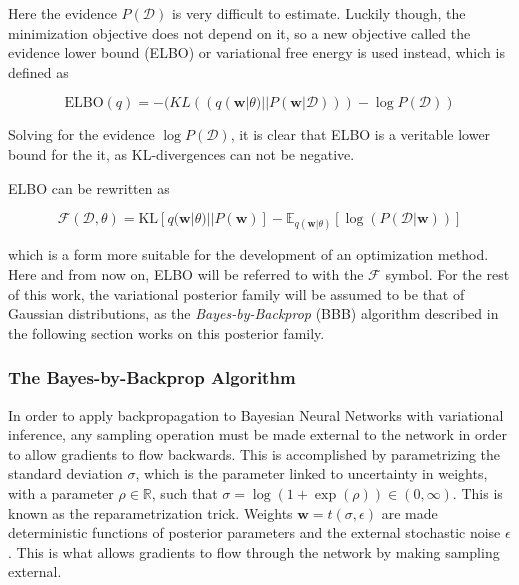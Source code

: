 	 Here the evidence $P(\mathcal{D})$ is very difficult to estimate. Luckily though, the minimization objective does not depend on it, so a new objective called the evidence lower bound (ELBO) or variational free energy is used instead, which is defined as 
	 
	 \begin{equation}
	 	\text{ELBO}(q) = -(KL((q(\pmb{w}|\theta) ||P(\pmb{w}|\mathcal{D}))) - \log P(\mathcal{D}))
	 \end{equation}
	 
	 Solving for the evidence $\log P(\mathcal{D})$, it is clear that ELBO is a veritable lower bound for the it, as KL-divergences can not be negative.  

	ELBO can be rewritten as
	
	\begin{equation}
	\label{eq:elbo}
		\mathcal{F}(\mathcal{D}, \theta) = 
		\text{KL}[q(\pmb{w}|\theta) || P(\pmb{w})] - \mathbb{E}_{q(\pmb{w}|\theta)}[\log(P(\mathcal{D}|\pmb{w}))]
	\end{equation}
	
	which is a form more suitable for the development of an optimization method. Here and from now on, ELBO will be referred to with the $\mathcal{F}$ symbol. For the rest of this work, the variational posterior family will be assumed to be that of Gaussian distributions, as the \textit{Bayes-by-Backprop} (BBB) algorithm described in the following section works on this posterior family. 
	
	\subsubsection*{The Bayes-by-Backprop Algorithm}

	In order to apply backpropagation to Bayesian Neural Networks with variational inference, any sampling operation must be made external to the network in order to allow gradients to flow backwards. This is accomplished by parametrizing the standard deviation $\sigma$, which is the parameter linked to uncertainty in weights, with a parameter $\rho \in \mathbb{R}$, such that $\sigma = \log(1 + \exp(\rho)) \in (0,\infty)$. 
	This is known as the reparametrization trick. Weights $\pmb{w} = t(\sigma, \epsilon)$ are made deterministic functions of posterior parameters and the external stochastic noise $\epsilon$. This is what allows gradients to flow through the network by making sampling external. 
	
